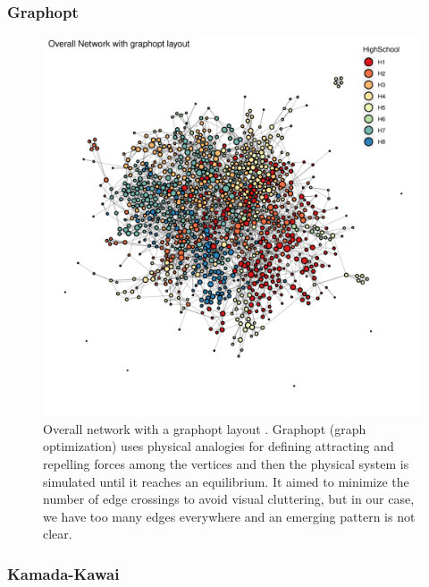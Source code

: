 \clearpage

\subsubsection{Graphopt}

    \begin{figure}[h]
        \centering
            \includegraphics[width=0.7\linewidth]{figures/Networks/Layouts/Graph_OverallNetwork_with_no_highlight_graphopt_HighSchool___graphopt.png} 
        \caption{Overall network with a graphopt layout \cite{gabor2023}. Graphopt (graph optimization) uses physical analogies for defining attracting and repelling forces among the vertices and then the physical system is simulated until it reaches an equilibrium. It aimed to minimize the number of edge crossings to avoid visual cluttering, but in our case, we have too many edges everywhere and an emerging pattern is not clear.}
        \label{figure:networksLayoutsGRAPHOPT}
    \end{figure}

\clearpage

\subsubsection{Kamada-Kawai}

